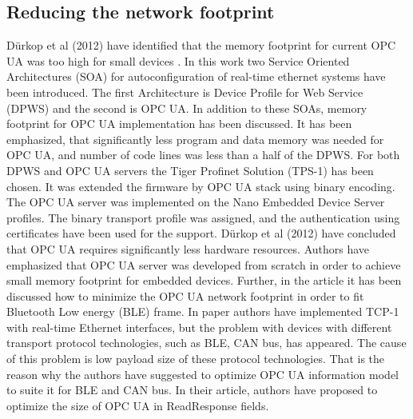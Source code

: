 \documentclass[conference]{IEEEtran}
\begin{document}
\subsection{Reducing the network footprint}
Dürkop et al (2012) have identified that the memory footprint for current OPC UA was too high for small devices \cite{durkop2012service}. In this work \cite{durkop2012service} two Service Oriented Architectures (SOA) for autoconfiguration of real-time ethernet systems have been introduced. The first Architecture is Device Profile for Web Service (DPWS) and the second is OPC UA. In addition to these SOAs, memory footprint for OPC UA implementation has been discussed. It has been emphasized, that significantly less program and data memory was needed for OPC UA, and number of code lines was less than a half of the DPWS. For both DPWS and OPC UA servers the Tiger Profinet Solution (TPS-1) has been chosen. It was extended the firmware by OPC UA stack using binary encoding. The OPC UA server was implemented on the Nano Embedded Device Server profiles. The binary transport profile was assigned, and the authentication using certificates have been used for the support. Dürkop et al (2012) have concluded that OPC UA requires significantly less hardware resources. Authors have emphasized that OPC UA server was developed from scratch in order to achieve small memory footprint for embedded devices. Further, in the article \cite{shrestha2013optimized} it has been discussed how to minimize the OPC UA network footprint in order to fit Bluetooth Low energy (BLE) frame. In paper \cite{imtiaz2013scalability} authors have implemented TCP-1 with real-time Ethernet interfaces, but the problem with devices with different transport protocol technologies, such as BLE, CAN bus, has appeared. The cause of this problem is low payload size of these protocol technologies. That is the reason why the authors \cite{shrestha2013optimized} have suggested to optimize OPC UA information model to suite it for BLE and CAN bus. In their article, authors have proposed to optimize the size of OPC UA in ReadResponse fields.
\end{document}
